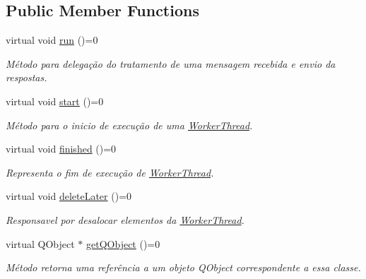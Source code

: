 \subsection*{Public Member Functions}
\begin{DoxyCompactItemize}
\item 
virtual void \hyperlink{classWorkerThread_a008dd6f762a2c20641afbb2a69319ca4}{run} ()=0
\begin{DoxyCompactList}\small\item\em Método para delegação do tratamento de uma mensagem recebida e envio da respostas. \end{DoxyCompactList}\item 
virtual void \hyperlink{classWorkerThread_a4d6d532dfbb27c5a435018ea697acb11}{start} ()=0\hypertarget{classWorkerThread_a4d6d532dfbb27c5a435018ea697acb11}{}\label{classWorkerThread_a4d6d532dfbb27c5a435018ea697acb11}

\begin{DoxyCompactList}\small\item\em Método para o inicio de execução de uma \hyperlink{classWorkerThread}{Worker\+Thread}. \end{DoxyCompactList}\item 
virtual void \hyperlink{classWorkerThread_a270d44343c31516acebd9544788e3886}{finished} ()=0\hypertarget{classWorkerThread_a270d44343c31516acebd9544788e3886}{}\label{classWorkerThread_a270d44343c31516acebd9544788e3886}

\begin{DoxyCompactList}\small\item\em Representa o fim de execução de \hyperlink{classWorkerThread}{Worker\+Thread}. \end{DoxyCompactList}\item 
virtual void \hyperlink{classWorkerThread_abf55cfb94dd10a2a3b2ff3896473c11b}{delete\+Later} ()=0\hypertarget{classWorkerThread_abf55cfb94dd10a2a3b2ff3896473c11b}{}\label{classWorkerThread_abf55cfb94dd10a2a3b2ff3896473c11b}

\begin{DoxyCompactList}\small\item\em Responsavel por desalocar elementos da \hyperlink{classWorkerThread}{Worker\+Thread}. \end{DoxyCompactList}\item 
virtual Q\+Object $\ast$ \hyperlink{classWorkerThread_a7cce841d4e0b98ebdeb0c7027045dfc4}{get\+Q\+Object} ()=0
\begin{DoxyCompactList}\small\item\em Método retorna uma referência a um objeto Q\+Object correspondente a essa classe. \end{DoxyCompactList}\end{DoxyCompactItemize}


